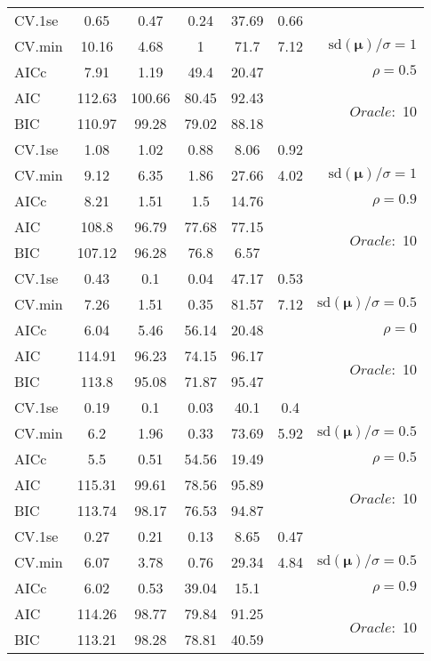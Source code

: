 \begin{table}
\begin{center}
\begin{tabular}{l*{5}{c}|r}
 \hline 
CV.1se & 0.65 & 0.47 & 0.24 & 37.69 & 0.66 & \\
CV.min & 10.16 & 4.68 & 1 & 71.7 & 7.12 &  $\mathrm{sd}(\mathbf{\mu})/\sigma=1$ \\
AICc & 7.91 & 1.19 & 49.4 & 20.47 & & $\rho=0.5$ \\
AIC & 112.63 & 100.66 & 80.45 & 92.43 & &  \multirow{2}{*}{$Oracle: $ 10} \\
BIC & 110.97 & 99.28 & 79.02 & 88.18 & &  \\
 \hline 
CV.1se & 1.08 & 1.02 & 0.88 & 8.06 & 0.92 & \\
CV.min & 9.12 & 6.35 & 1.86 & 27.66 & 4.02 &  $\mathrm{sd}(\mathbf{\mu})/\sigma=1$ \\
AICc & 8.21 & 1.51 & 1.5 & 14.76 & & $\rho=0.9$ \\
AIC & 108.8 & 96.79 & 77.68 & 77.15 & &  \multirow{2}{*}{$Oracle: $ 10} \\
BIC & 107.12 & 96.28 & 76.8 & 6.57 & &  \\
 \hline 
CV.1se & 0.43 & 0.1 & 0.04 & 47.17 & 0.53 & \\
CV.min & 7.26 & 1.51 & 0.35 & 81.57 & 7.12 &  $\mathrm{sd}(\mathbf{\mu})/\sigma=0.5$ \\
AICc & 6.04 & 5.46 & 56.14 & 20.48 & & $\rho=0$ \\
AIC & 114.91 & 96.23 & 74.15 & 96.17 & &  \multirow{2}{*}{$Oracle: $ 10} \\
BIC & 113.8 & 95.08 & 71.87 & 95.47 & &  \\
 \hline 
CV.1se & 0.19 & 0.1 & 0.03 & 40.1 & 0.4 & \\
CV.min & 6.2 & 1.96 & 0.33 & 73.69 & 5.92 &  $\mathrm{sd}(\mathbf{\mu})/\sigma=0.5$ \\
AICc & 5.5 & 0.51 & 54.56 & 19.49 & & $\rho=0.5$ \\
AIC & 115.31 & 99.61 & 78.56 & 95.89 & &  \multirow{2}{*}{$Oracle: $ 10} \\
BIC & 113.74 & 98.17 & 76.53 & 94.87 & &  \\
 \hline 
CV.1se & 0.27 & 0.21 & 0.13 & 8.65 & 0.47 & \\
CV.min & 6.07 & 3.78 & 0.76 & 29.34 & 4.84 &  $\mathrm{sd}(\mathbf{\mu})/\sigma=0.5$ \\
AICc & 6.02 & 0.53 & 39.04 & 15.1 & & $\rho=0.9$ \\
AIC & 114.26 & 98.77 & 79.84 & 91.25 & &  \multirow{2}{*}{$Oracle: $ 10} \\
BIC & 113.21 & 98.28 & 78.81 & 40.59 & &  \\
 \hline 
\end{tabular}
\end{center}
\vspace{-1cm}
\end{table}




